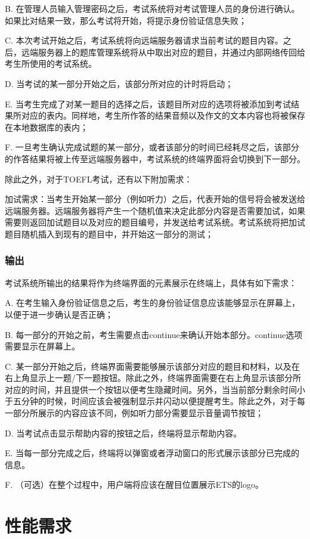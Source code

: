 B. 在管理人员输入管理密码之后，考试系统将对考试管理人员的身份进行确认。如果比对结果一致，那么考试将开始，将提示身份验证信息失败；

C. 本次考试开始之后，考试系统将向远端服务器请求当前考试的题目内容。之后，远端服务器上的题库管理系统将从中取出对应的题目，并通过内部网络传回给考生所使用的考试系统。

D. 当考试的某一部分开始之后，该部分所对应的计时将启动；

E. 当考生完成了对某一题目的选择之后，该题目所对应的选项将被添加到考试结果所对应的表内。同样地，考生所作答的结果音频以及作文的文本内容也将被保存在本地数据库的表内；

F. 一旦考生确认完成试题的某一部分，或者该部分的时间已经耗尽之后，该部分的作答结果将被上传至远端服务器中，考试系统的终端界面将会切换到下一部分。

除此之外，对于TOEFL考试，还有以下附加需求：

加试需求：当考生开始某一部分（例如听力）之后，代表开始的信号将会被发送给远端服务器。远端服务器将产生一个随机值来决定此部分内容是否需要加试，如果需要则返回加试题目以及对应的题目编号，并发送给考试系统。考试系统将把加试题目随机插入到现有的题目中，并开始这一部分的测试；

\subsubsection{输出}
考试系统所输出的结果将作为终端界面的元素展示在终端上，具体有如下需求：

A. 在考生输入身份验证信息之后，考生的身份验证信息应该能够显示在屏幕上，以便于进一步确认是否正确；

B. 每一部分的开始之前，考生需要点击continue来确认开始本部分。continue选项需要显示在屏幕上。

C. 某一部分开始之后，终端界面需要能够展示该部分对应的题目和材料，以及在右上角显示上一题/下一题按钮。除此之外，终端界面需要在右上角显示该部分所对应的时间，并且提供一个按钮以便考生隐藏时间。另外，当当前部分剩余时间小于五分钟的时候，时间应该会被强制显示并闪动以便提醒考生。除此之外，对于每一部分所展示的内容应该不同，例如听力部分需要显示音量调节按钮；

D. 当考试点击显示帮助内容的按钮之后，终端将显示帮助内容。

E. 当每一部分完成之后，终端将以弹窗或者浮动窗口的形式展示该部分已完成的信息。

F. （可选）在整个过程中，用户端将应该在醒目位置展示ETS的logo。



\section{性能需求}

